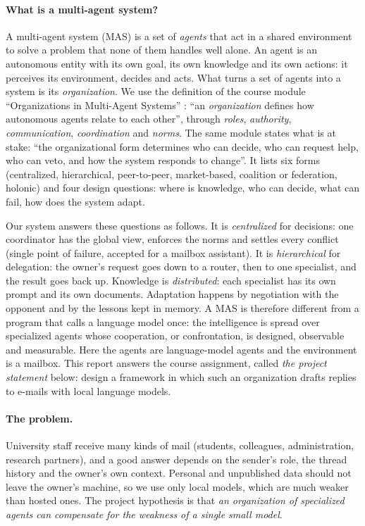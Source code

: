 \documentclass[11pt,a4paper]{article}
\begin{document}
\paragraph{What is a multi-agent system?}
A multi-agent system (MAS) is a set of \emph{agents} that act in a shared environment to solve a problem that none of
them handles well alone. An agent is an autonomous entity with its own goal, its own knowledge and its own actions:
it perceives its environment, decides and acts. What turns a set of agents into a system is its
\emph{organization}. We use the definition of the course module ``Organizations in Multi-Agent Systems''
\cite{cm1}: ``an \emph{organization} defines how autonomous agents relate to each other'', through \emph{roles},
\emph{authority}, \emph{communication}, \emph{coordination} and \emph{norms}. The same module states what is at stake:
``the organizational form determines who can decide, who can request help, who can veto, and how the system responds
to change''. It lists six forms (centralized, hierarchical, peer-to-peer, market-based, coalition or federation,
holonic) and four design questions: where is knowledge, who can decide, what can fail, how does the system adapt.

Our system answers these questions as follows. It is \emph{centralized} for decisions: one coordinator has the global
view, enforces the norms and settles every conflict (single point of failure, accepted for a mailbox assistant). It is
\emph{hierarchical} for delegation: the owner's request goes down to a router, then to one specialist, and the result
goes back up. Knowledge is \emph{distributed}: each specialist has its own prompt and its own documents. Adaptation
happens by negotiation with the opponent and by the lessons kept in memory. A MAS is therefore different from a program
that calls a language model once: the intelligence is spread over specialized agents whose cooperation, or
confrontation, is designed, observable and measurable. Here the agents are language-model agents and the environment
is a mailbox. This report answers the course assignment, called \emph{the project statement} below: design a framework
in which such an organization drafts replies to e-mails with local language models.

\paragraph{The problem.}
University staff receive many kinds of mail (students, colleagues, administration, research partners), and a good
answer depends on the sender's role, the thread history and the owner's own context. Personal and unpublished data
should not leave the owner's machine, so we use only local models, which are much weaker than hosted ones.
The project hypothesis is that \emph{an organization of specialized agents can compensate for the weakness of a
single small model}.
\end{document}
